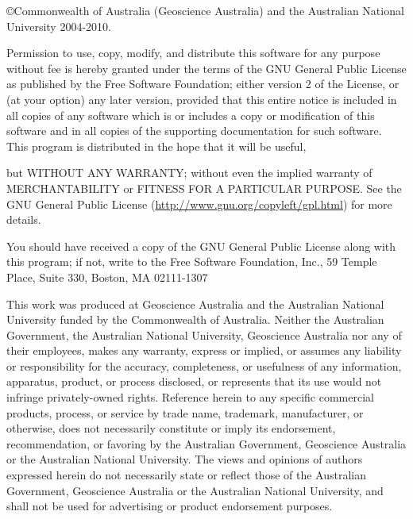 %
%
%
%
%
%
%
%

\vspace*{0.5in}

\copyright Commonwealth of Australia (Geoscience Australia) and the Australian 
National University 2004-2010.

Permission to use, copy, modify, and distribute this software for any
purpose without fee is hereby granted under the terms of the GNU
General Public License as published by the Free Software Foundation;
either version 2 of the License, or (at your option) any later
version, provided that this entire notice is included in all copies
of any software which is or includes a copy or modification of this
software and in all copies of the supporting documentation for such
software.
This program is distributed in the hope that it will be useful,

but WITHOUT ANY WARRANTY; without even the implied warranty of
MERCHANTABILITY or FITNESS FOR A PARTICULAR PURPOSE.  See the
GNU General Public License (\url{http://www.gnu.org/copyleft/gpl.html})
for more details.

You should have received a copy of the GNU General Public License
along with this program; if not, write to the Free Software
Foundation, Inc., 59 Temple Place, Suite 330, Boston, MA  02111-1307

This work was produced at Geoscience Australia and the Australian
National University funded by the Commonwealth of Australia. Neither
the Australian Government, the Australian National University,
Geoscience Australia nor any of their employees, makes any warranty,
express or implied, or assumes any liability or responsibility for
the accuracy, completeness, or usefulness of any information,
apparatus, product, or process disclosed, or represents that its use
would not infringe privately-owned rights. Reference herein to any
specific commercial products, process, or service by trade name,
trademark, manufacturer, or otherwise, does not necessarily
constitute or imply its endorsement, recommendation, or favoring by
the Australian Government, Geoscience Australia or the Australian
National University.  The views and opinions of authors expressed
herein do not necessarily state or reflect those of the Australian
Government, Geoscience Australia or the Australian National
University, and shall not be used for advertising or product
endorsement purposes.


